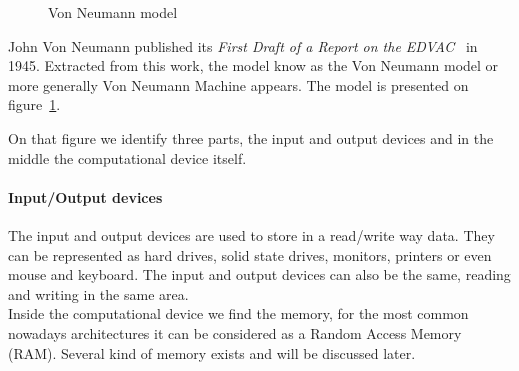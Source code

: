 \begin{figure}
\centering 
{}
\caption{Von Neumann model}
\label{fig:1_HPC:von_neumann_model}
\end{figure}

John Von Neumann published its \textit{First Draft of a Report on the EDVAC}~\cite{von1993first} in 1945. 
Extracted from this work, the model know as the Von Neumann model or more generally Von Neumann Machine appears. 
The model is presented on figure~\ref{fig:1_HPC:von_neumann_model}.

On that figure we identify three parts, the input and output devices and in the middle the computational device itself. 
\paragraph{Input/Output devices}
The input and output devices are used to store in a read/write way data. 
They can be represented as hard drives, solid state drives, monitors, printers or even mouse and keyboard.
The input and output devices can also be the same, reading and writing in the same area.\\

Inside the computational device we find the memory, for the most common nowadays architectures it can be considered as a Random Access Memory (RAM). 
Several kind of memory exists and will be discussed later. 

